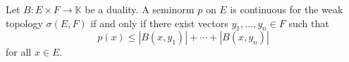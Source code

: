 Let $B: E \times F \to \mathbb{K}$ be a duality. A seminorm $p$ on $E$ is continuous for the weak topology $\sigma(E, F)$ if and only if there exist vectors $y_1, \ldots, y_n \in F$ such that
$$p(x) \leq |B(x, y_1)| + \cdots + |B(x, y_n)|$$
for all $x \in E$.
